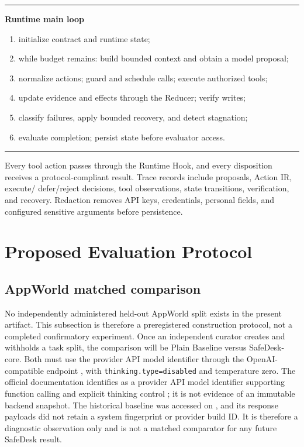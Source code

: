 \documentclass[10pt]{article}
\newcommand{\code}[1]{\texttt{#1}}
\begin{document}
\begin{center}
\begin{minipage}{0.88\linewidth}
\small
\hrule\vspace{4pt}
\textbf{Runtime main loop}
\begin{enumerate}[leftmargin=1.8em,itemsep=0pt]
  \item initialize contract and runtime state;
  \item while budget remains: build bounded context and obtain a model proposal;
  \item normalize actions; guard and schedule calls; execute authorized tools;
  \item update evidence and effects through the Reducer; verify writes;
  \item classify failures, apply bounded recovery, and detect stagnation;
  \item evaluate completion; persist state before evaluator access.
\end{enumerate}
\vspace{2pt}\hrule
\end{minipage}
\end{center}

Every tool action passes through the Runtime Hook, and every disposition receives
a protocol-compliant result. Trace records include proposals, Action IR, execute/
defer/reject decisions, tool observations, state transitions, verification, and
recovery. Redaction removes API keys, credentials, personal fields, and configured
sensitive arguments before persistence.

\section{Proposed Evaluation Protocol}

\subsection{AppWorld matched comparison}
\label{sec:appworld-protocol}

No independently administered held-out AppWorld split exists in the present
artifact. This subsection is therefore a preregistered construction protocol, not
a completed confirmatory experiment. Once an independent curator creates and
withholds a task split, the comparison will be Plain Baseline versus SafeDesk-core.
Both must
use the provider API model identifier \AWModelID{} through the OpenAI-compatible
endpoint \AWAPIEndpoint{}, with \code{thinking.type=disabled} and temperature
zero. The official documentation identifies \AWModelID{} as a provider API model
identifier supporting function calling and explicit thinking control
\citep{deepseek2026v4api,deepseek2026thinking}; it is not evidence of an immutable
backend snapshot. The historical baseline was accessed on \AWModelAccessDate, and
its response payloads did not retain a system fingerprint or provider build ID.
It is therefore a diagnostic observation only and is not a matched comparator for
any future SafeDesk result.
\end{document}
